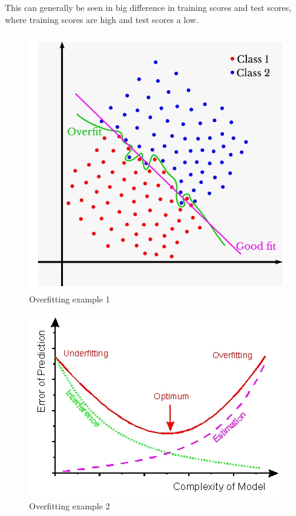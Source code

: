 \documentclass[
  11pt,
  british,
]{article}
\begin{document}
This can generally be seen in big difference in training scores and test
scores, where training scores are high and test scores a low.

\begin{figure}
\centering
\includegraphics{Pasted_image_20220216115427.png}
\caption{Overfitting example 1}
\end{figure}

\begin{figure}
\centering
\includegraphics{Pasted_image_20220216115205.png}
\caption{Overfitting example 2}
\end{figure}
\end{document}
